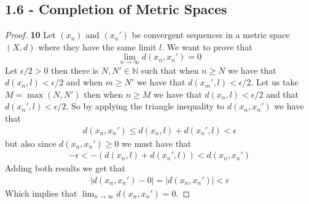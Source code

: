 \documentclass[11pt]{article}
\newcommand{\N}{\mathbb{N}}
\theoremstyle{definition}
\begin{document}
\subsection*{1.6 - Completion of Metric Spaces}
\begin{proof}{\textbf{10}}
    Let $(x_n)$ and $(x_n')$ be convergent sequences in a metric space $(X,d)$
    where they have the same limit $l$. We want to prove that
    $$\lim_{n\to\infty} d(x_n, x_n') = 0$$
    Let $\epsilon/2 > 0$ then there is $N,N' \in \N$ such that when
    $n\geq N$ we have that $d(x_n, l) < \epsilon/2$
    and when $m\geq N'$ we have that $d(x_m', l) < \epsilon/2$. Let us take 
    $M = \max(N, N')$ then when $n \geq M$ we have that $d(x_n, l) < \epsilon/2$
    and that $d(x_n', l) < \epsilon/2$. So by applying the triangle inequality
    to $d(x_n, x_n')$ we have that
    \begin{align*}
        d(x_n, x_n') \leq d(x_n, l) + d(x_n', l) < \epsilon
    \end{align*}
    but also since $d(x_n, x_n') \geq 0$ we must have that
    \begin{align*}
        -\epsilon < -(d(x_n, l) + d(x_n', l)) < d(x_n, x_n')
    \end{align*}
    Adding both results we get that
    \begin{align*}
        |d(x_n,x_n') - 0| = |d(x_n,x_n')| < \epsilon
    \end{align*}
    Which implies that $\lim_{n\to\infty} d(x_n, x_n') = 0$.
\end{proof}
\cleardoublepage
\end{document}
